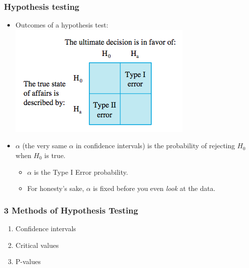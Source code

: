 \documentclass[handout]{beamer}\usepackage[]{graphicx}\usepackage[]{color}
\providecommand{\q}{$\quad$ \newline}
\numberwithin{equation}{section}
\begin{document}
\begin{frame}
\frametitle{Hypothesis testing}
\begin{itemize}
\item Outcomes of a hypothesis test: \q
{} \includegraphics{../../fig/typeerrors.png}
\pause \item $\alpha$ (the very same $\alpha$ in confidence intervals) is the probability of rejecting $H_0$ when $H_0$ is true.
\begin{itemize}
\pause \item $\alpha$ is the Type I Error probability.
\pause \item For honesty's sake, $\alpha$ is fixed before you even \emph{look} at the data.
\end{itemize} 
\end{itemize}
\end{frame}

\begin{frame}
\frametitle{3 Methods of Hypothesis Testing}
\begin{enumerate}[1. ]
\item Confidence intervals
\pause \item Critical values
\pause \item P-values
\end{enumerate}
\end{frame}
\end{document}
